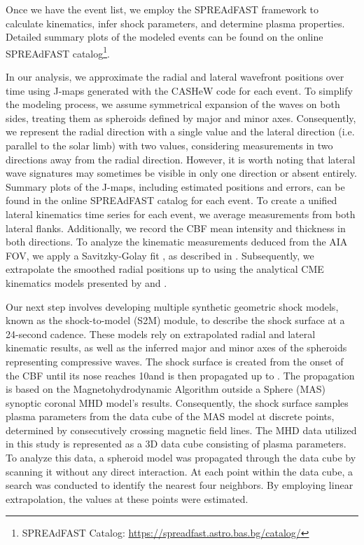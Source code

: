 Once we have the event list, we employ the SPREAdFAST framework to calculate kinematics, infer shock parameters, and determine plasma properties. Detailed summary plots of the modeled events can be found on the online SPREAdFAST catalog\footnote{SPREAdFAST Catalog: \url{https://spreadfast.astro.bas.bg/catalog/}}.

In our analysis, we approximate the radial and lateral wavefront positions over time using J-maps generated with the CASHeW code for each event. To simplify the modeling process, we assume symmetrical expansion of the waves on both sides, treating them as spheroids defined by major and minor axes. Consequently, we represent the radial direction with a single value and the lateral direction (i.e. parallel to the solar limb) with two values, considering measurements in two directions away from the radial direction. However, it is worth noting that lateral wave signatures may sometimes be visible in only one direction or absent entirely. Summary plots of the J-maps, including estimated positions and errors, can be found in the online SPREAdFAST catalog for each event. To create a unified lateral kinematics time series for each event, we average measurements from both lateral flanks. Additionally, we record the CBF mean intensity and thickness in both directions.
To analyze the kinematic measurements deduced from the AIA FOV, we apply a Savitzky-Golay fit \citep{savitzky_1964}, as described in \citet{kozarev_2019}. Subsequently, we extrapolate the smoothed radial positions up to \rsun using the analytical CME kinematics models presented by \citet{gallagher_2003} and \citet{byrne_2013}.

Our next step involves developing multiple synthetic geometric shock models, known as the shock-to-model (S2M) module, to describe the shock surface at a 24-second cadence. These models rely on extrapolated radial and lateral kinematic results, as well as the inferred major and minor axes of the spheroids representing compressive waves. The shock surface is created from the onset of the CBF until its nose reaches 10\rsun and is then propagated up to \rsun. The propagation is based on the Magnetohydrodynamic Algorithm outside a Sphere (MAS) synoptic coronal MHD model's results. Consequently, the shock surface samples plasma parameters from the data cube of the MAS model at discrete points, determined by consecutively crossing magnetic field lines.
The MHD data utilized in this study is represented as a 3D data cube consisting of plasma parameters. To analyze this data, a spheroid model was propagated through the data cube by scanning it without any direct interaction. At each point within the data cube, a search was conducted to identify the nearest four neighbors. By employing linear extrapolation, the values at these points were estimated.


